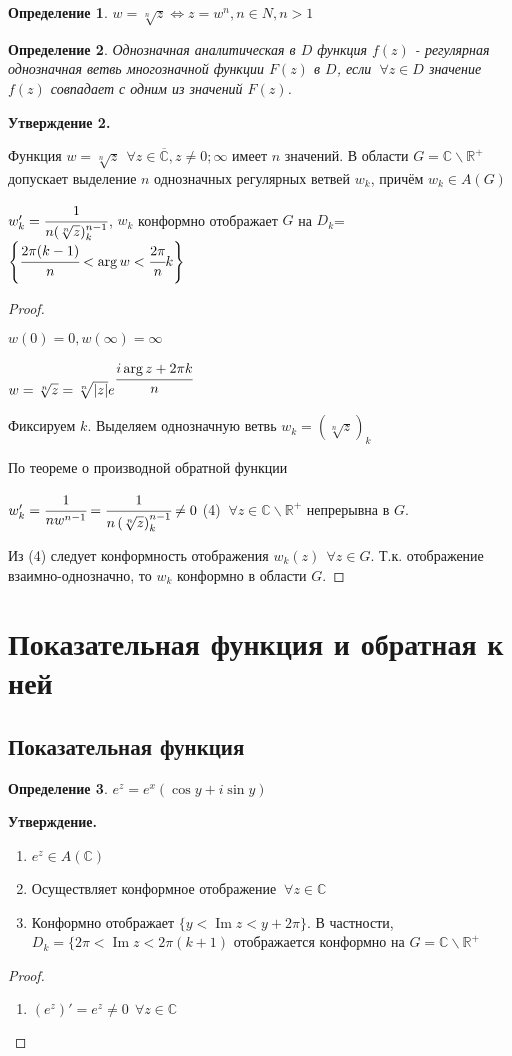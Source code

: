 \documentclass[draft]{report}
\newcommand{\forcenewline}{$\phantom{\mbox{newline}}$}
\newcommand{\R}{\mathbb{R}}
\renewcommand{\C}{\mathbb{C}}
\newcommand{\LRA}{\Leftrightarrow}
\renewcommand{\bar}{\overline}
\renewcommand{\Im}{\mathop{\mathrm{Im}}\nolimits}
\newcommand{\F}{\ \forall}
\newcommand{\CC}{\bar{\C}}
\newcommand{\opr}[1]{\begin{opred}#1\end{opred}}
\newtheorem*{opred}{Определение}
\theoremstyle{remark}
\begin{document}
\opr{$w=\sqrt[n]{z}\LRA z=w^n,n\in N, n>1$}
\opr{Однозначная аналитическая в $D$ функция $f(z)$ - регулярная однозначная ветвь многозначной функции $F(z)$ в $D$, если $\F z\in D$ значение $f(z)$ совпадает с одним из значений $F(z)$.}
{\bfseries Утверждение 2.}

Функция $w=\sqrt[n]{z}\ \F z\in\CC,z\neq 0;\infty$ имеет $n$ значений. В области $G=\C\smallsetminus\R^+$ допускает выделение $n$ однозначных регулярных ветвей $w_k$, причём $w_k\in A(G)$

$w_k'=\cfrac{1}{n(\sqrt[n]{z})^{n-1}_k}$, $w_k$ конформно отображает $G$ на $D_k$=$\left\{\cfrac{2\pi(k-1)}{n}<\arg w<\cfrac{2\pi}{n}k\right\}$

\begin{proof}
\forcenewline

$w(0)=0, w(\infty)=\infty$

$w=\sqrt[n]{z}=\sqrt[n]{|z|}e^{\cfrac{i\arg z+2\pi k}{n}}$

Фиксируем $k$. Выделяем однозначную ветвь $w_k=\left(\sqrt[n]{z}\right)_k$

По теореме о производной обратной функции

$w_k'=\cfrac{1}{nw^{n-1}}=\cfrac{1}{n\left(\sqrt[n]{z}\right)^{n-1}_k}\neq 0$ (4) $\F z\in\C\smallsetminus\R^+$ непрерывна в $G$.

Из (4) следует конформность отображения $w_k(z)\ \F z\in G$. Т.к. отображение взаимно-однозначно, то $w_k$ конформно в области $G$.
\end{proof}

\section{Показательная функция и обратная к ней}

\subsection{Показательная функция}

\opr{$e^z=e^x(\cos y+i\sin y)$}
{\bfseries Утверждение.}
\begin{enumerate}
\item $e^z\in A(\C)$
\item Осуществляет конформное отображение $\F z\in\C$
\item Конформно отображает $\{y<\Im z<y+2\pi\}$. В частности, $D_k=\{2\pi <\Im z<2\pi(k+1)$ отображается конформно на $G=\C\smallsetminus\R^+$
\end{enumerate}
\begin{proof}
\forcenewline
\begin{enumerate}
\item $(e^z)'=e^z\neq0\ \F z\in\C$
\end{enumerate}
\end{proof}
\end{document}
